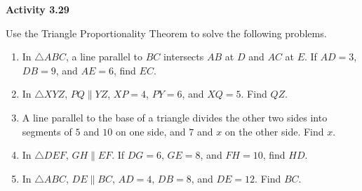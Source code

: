 \vspace{0.3ex}
\noindent\textbf{Activity 3.29}

\vspace{0.2ex}

Use the Triangle Proportionality Theorem to solve the following problems.

\begin{enumerate}[label=\color{blue}\arabic*.]
    \item In \(\triangle ABC\), a line parallel to \(BC\) intersects \(AB\) at \(D\) and \(AC\) at \(E\). If \(AD = 3\), \(DB = 9\), and \(AE = 6\), find \(EC\).
    \item In \(\triangle XYZ\), \(PQ \parallel YZ\), \(XP = 4\), \(PY = 6\), and \(XQ = 5\). Find \(QZ\).
    \item A line parallel to the base of a triangle divides the other two sides into segments of \(5\) and \(10\) on one side, and \(7\) and \(x\) on the other side. Find \(x\).
    \item In \(\triangle DEF\), \(GH \parallel EF\). If \(DG = 6\), \(GE = 8\), and \(FH = 10\), find \(HD\).
    \item In \(\triangle ABC\), \(DE \parallel BC\), \(AD = 4\), \(DB = 8\), and \(DE = 12\). Find \(BC\).
\end{enumerate}
